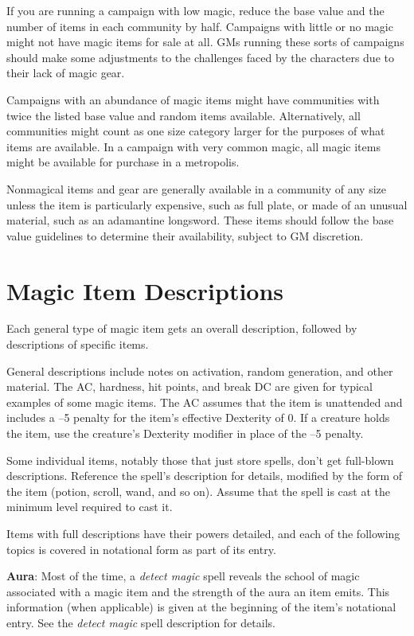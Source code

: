 If you are running a campaign with low magic, reduce the base value and the number of items in each community by half. Campaigns with little or no magic might not have magic items for sale at all. GMs running these sorts of campaigns should make some adjustments to the challenges faced by the characters due to their lack of magic gear.
				
Campaigns with an abundance of magic items might have communities with twice the listed base value and random items available. Alternatively, all communities might count as one size category larger for the purposes of what items are available. In a campaign with very common magic, all magic items might be available for purchase in a metropolis.
				
Nonmagical items and gear are generally available in a community of any size unless the item is particularly expensive, such as full plate, or made of an unusual material, such as an adamantine longsword. These items should follow the base value guidelines to determine their availability, subject to GM discretion. 
				
\section{Magic Item Descriptions}

				
Each general type of magic item gets an overall description, followed by descriptions of specific items.
				
General descriptions include notes on activation, random generation, and other material. The AC, hardness, hit points, and break DC are given for typical examples of some magic items. The AC assumes that the item is unattended and includes a --5 penalty for the item's effective Dexterity of 0. If a creature holds the item, use the creature's Dexterity modifier in place of the --5 penalty.
				
Some individual items, notably those that just store spells, don't get full-blown descriptions. Reference the spell's description for details, modified by the form of the item (potion, scroll, wand, and so on). Assume that the spell is cast at the minimum level required to cast it.
				
Items with full descriptions have their powers detailed, and each of the following topics is covered in notational form as part of its entry.
				
\textbf{Aura}: Most of the time, a \textit{detect magic }spell reveals the school of magic associated with a magic item and the strength of the aura an item emits. This information (when applicable) is given at the beginning of the item's notational entry. See the \textit{detect magic }spell description for details.
				
